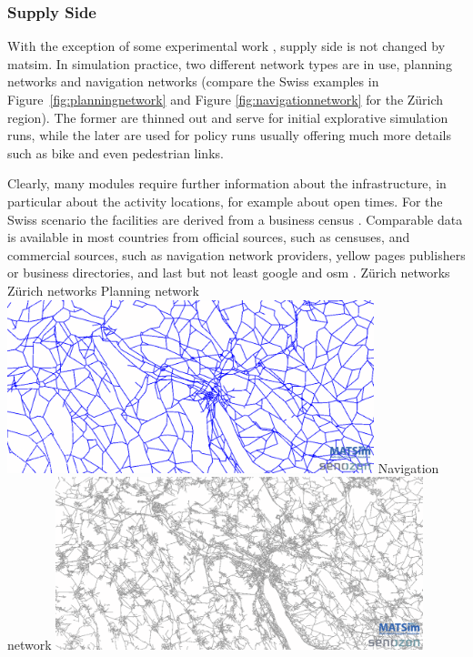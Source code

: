\subsubsection{Supply Side}
With the exception of some experimental work \citep[][]{HorniEtAl_TechRep_IVT_2012}, supply side is not changed by \gls{matsim}. In simulation practice, two different network types are in use, planning networks and navigation networks (compare the Swiss examples in Figure~\ref{fig:planningnetwork} and Figure \ref{fig:navigationnetwork} for the Zürich region). The former are thinned out and serve for initial explorative simulation runs, while the later are used for policy runs usually offering much more details such as bike and even pedestrian links.

Clearly, many modules require further information about the infrastructure, in particular about the activity locations, for example about open times. For the Swiss scenario the facilities are derived from a business census \citep[][]{..}. Comparable data is available in most countries from official sources, such as censuses, and commercial sources, such as navigation network providers, yellow pages publishers or business directories, and last but not least google and \gls{osm} \citep[][]{OpenStreetMap_Webpage_2015}.
%
\createfigure%
{Zürich networks}%
{Zürich networks}%
{\label{fig:zhnetwork}}%
{%
  \createsubfigure%
  {Planning network}%
  {\includegraphics[width=0.8\textwidth,angle=0]{using/figures/planning.png}}%
  {\label{fig:planningnetwork}}%
  {}%
  \createsubfigure%
  {Navigation network}%
	{\includegraphics[width=0.8\textwidth,angle=0]{using/figures/navigation.png}}%
  {\label{fig:navigationnetwork}}%
  {}%
}%
{}

